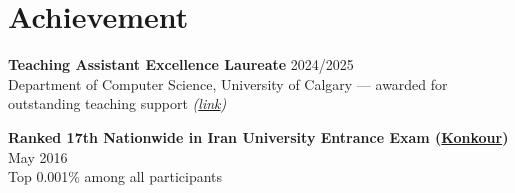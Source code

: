 \documentclass[a4paper,10pt]{article}
\begin{document}
\section*{Achievement}

\textbf{Teaching Assistant Excellence Laureate} \hfill 2024/2025 \\
Department of Computer Science, University of Calgary --- awarded for outstanding teaching support \textit{(\href{https://science.ucalgary.ca/computer-science/about/our-department/ta-recognition-2024-2025}{link})}

\vspace{0.35em}

\textbf{Ranked 17th Nationwide in Iran University Entrance Exam (\href{https://en.wikipedia.org/wiki/Iranian_University_Entrance_Exam}{Konkour})} \hfill May 2016 \\
Top 0.001\% among all participants
\end{document}

